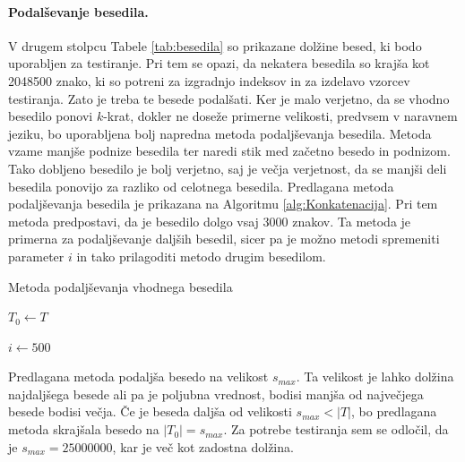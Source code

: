 \paragraph{Podalševanje besedila.}

V drugem stolpcu Tabele \ref{tab:besedila} so prikazane dolžine besed, ki bodo uporabljen za testiranje. Pri tem se opazi, da nekatera besedila so krajša kot 2048500 znako, ki so potreni za izgradnjo indeksov in za izdelavo vzorcev testiranja. Zato je treba te besede podalšati. Ker je malo verjetno, da se vhodno besedilo ponovi $k$-krat, dokler ne doseže primerne velikosti, predvsem v naravnem jeziku, bo uporabljena bolj napredna metoda podaljševanja besedila. Metoda vzame manjše podnize besedila ter naredi stik med začetno besedo in podnizom. Tako dobljeno besedilo je bolj verjetno, saj je večja verjetnost, da se manjši deli besedila ponovijo za razliko od celotnega besedila. Predlagana metoda podaljševanja besedila je prikazana na Algoritmu \ref{alg:Konkatenacija}. Pri tem metoda predpostavi, da je besedilo dolgo vsaj $3000$ znakov. Ta metoda je primerna za podaljševanje daljših besedil, sicer pa je možno metodi spremeniti parameter $i$ in tako prilagoditi metodo drugim besedilom.


\begin{algorithm}[htb]

\caption{Metoda podaljševanja vhodnega besedila}\label{alg:Konkatenacija}
{
    {$T_0\leftarrow T$}

    {$i\leftarrow 500$}
    
    
}
\end{algorithm}

Predlagana metoda podaljša besedo na velikost $s_{max}$. Ta velikost je lahko dolžina najdaljšega besede ali pa je poljubna vrednost, bodisi manjša od največjega besede bodisi večja. Če je beseda daljša od velikosti $s_{max}<|T|$, bo predlagana metoda skrajšala besedo na $|T_0|=s_{max}$. Za potrebe testiranja sem se odločil, da je $s_{max}=25000000$, kar je več kot zadostna dolžina.


